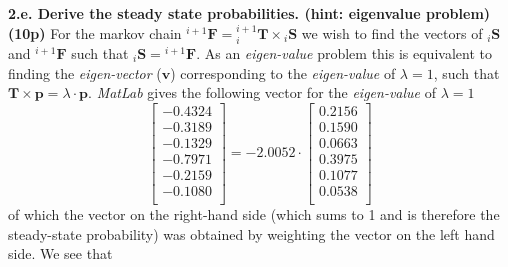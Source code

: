 \documentclass[a4paper,10pt]{article}
\newcommand{\matst}[1]{\ensuremath{{_{#1}}{\mathbf{S}}}}
\newcommand{\matfin}[1]{\ensuremath{{^{#1}}{\mathbf{F}}}}
\newcommand{\mattrans}[2]{{\ensuremath{{_{#1}^{#2}}{\mathbf{T}}}}}
\begin{document}
\newline\noindent\newline\noindent
\textbf{2.e. Derive the steady state probabilities. (hint: eigenvalue problem) (10p)}
\newline\noindent\newline\noindent
For the markov chain ${\matfin{i+1}}={\mattrans{i}{i+1}}{\times}{\matst{i}}$ we wish to find the vectors of $\matst{i}$ and $\matfin{i+1}$ such that $\matst{i}=\matfin{i+1}$. As an \emph{eigen-value} 
problem this is equivalent to finding the \emph{eigen-vector} ($\mathbf{v}$) corresponding to the \emph{eigen-value} of $\lambda = 1$,
such that $\mathbf{T}{\times}\mathbf{p}=\lambda\cdot\mathbf{p}$.
\newline\noindent\newline\noindent
\emph{MatLab} gives the following vector for the \emph{eigen-value} of $\lambda=1$
\begin{equation*}
\left[
\begin{array}{c}
-0.4324
\\
-0.3189
\\
-0.1329
\\
-0.7971
\\
-0.2159
\\
-0.1080 \\
\end{array}\right]=-2.0052\cdot
\boxed{
\left[\begin{array}{c}
0.2156
\\
0.1590
\\
0.0663
\\
0.3975
\\
0.1077
\\
0.0538 \\
\end{array}\right]
}
\end{equation*}
\newline\noindent\newline\noindent
of which the vector on the right-hand side (which sums to 1 and is therefore the steady-state probability) was obtained by weighting the vector on the left hand side.
\newline\noindent\newline\noindent
We see that
\end{document}
